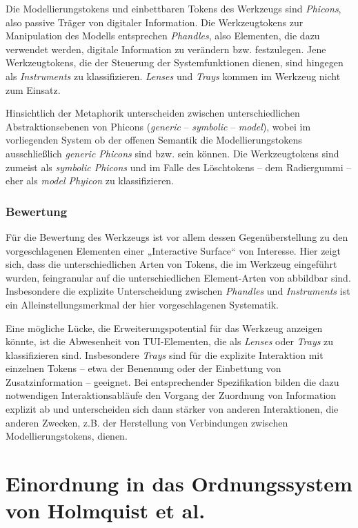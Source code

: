 Die Modellierungstokens und einbettbaren Tokens des Werkzeugs sind \emph{Phicons}, also passive Träger von digitaler Information. Die Werkzeugtokens zur Manipulation des Modells entsprechen \emph{Phandles}, also Elementen, die dazu verwendet werden, digitale Information zu verändern bzw. festzulegen. Jene Werkzeugtokens, die der Steuerung der Systemfunktionen dienen, sind hingegen als \emph{Instruments} zu klassifizieren. \emph{Lenses} und \emph{Trays} kommen im Werkzeug nicht zum Einsatz.

Hinsichtlich der Metaphorik unterscheiden \citet{Ullmer97} zwischen unterschiedlichen Abstraktionsebenen von Phicons (\emph{generic} -- \emph{symbolic} -- \emph{model}), wobei im vorliegenden System ob der offenen Semantik die Modellierungstokens ausschließlich \emph{generic Phicons} sind bzw. sein können. Die Werkzeugtokens sind zumeist als \emph{symbolic Phicons} und im Falle des Löschtokens -- dem Radiergummi -- eher als \emph{model Phyicon} zu klassifizieren.

\subsubsection{Bewertung} 

Für die Bewertung des Werkzeugs ist vor allem dessen Gegenüberstellung zu den vorgeschlagenen Elementen einer „Interactive Surface“ von Interesse. Hier zeigt sich, dass die unterschiedlichen Arten von Tokens, die im Werkzeug eingeführt wurden, feingranular auf die unterschiedlichen Element-Arten von \citet{Ishii97} abbildbar sind. Insbesondere die explizite Unterscheidung zwischen \emph{Phandles} und \emph{Instruments} ist ein Alleinstellungsmerkmal der hier vorgeschlagenen Systematik.

Eine mögliche Lücke, die Erweiterungspotential für das Werkzeug anzeigen könnte, ist die Abwesenheit von TUI-Elementen, die als \emph{Lenses} oder \emph{Trays} zu klassifizieren sind. Insbesondere \emph{Trays} sind für die explizite Interaktion mit einzelnen Tokens -- etwa der Benennung oder der Einbettung von Zusatzinformation -- geeignet. Bei entsprechender Spezifikation bilden die dazu notwendigen Interaktionsabläufe den Vorgang der Zuordnung von Information explizit ab und unterscheiden sich dann stärker von anderen Interaktionen, die anderen Zwecken, z.B. der Herstellung von Verbindungen zwischen Modellierungstokens, dienen.


\section{Einordnung in das Ordnungssystem von Holmquist et al.} %
\label{sec:einordnung_in_das_ordnungssystem_von_holmquist_et_al_}


